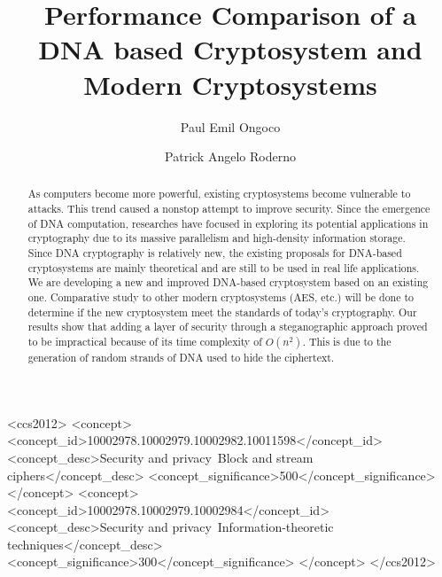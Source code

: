 \documentclass[acmlarge]{acmart}
\begin{document}
\title{Performance Comparison of a DNA based Cryptosystem and Modern Cryptosystems} 
\author{Paul Emil Ongoco}
\author{Patrick Angelo Roderno}


\begin{abstract}
As computers become more powerful, existing cryptosystems become vulnerable to attacks. This trend caused a nonstop attempt to improve security. Since the emergence of DNA computation, researches have focused in exploring its potential applications in cryptography due to its massive parallelism and high-density information storage. Since DNA cryptography is relatively new, the existing proposals for DNA-based cryptosystems are mainly theoretical and are still to be used in real life applications. We are developing a new and improved DNA-based cryptosystem based on an existing one. Comparative study to other modern cryptosystems (AES, etc.) will be done to determine if the new cryptosystem meet the standards of today's cryptography. Our results show that adding a layer of security through a steganographic approach proved to be impractical because of its time complexity of $O(n^2)$. This is due to the generation of random strands of DNA used to hide the ciphertext. 
\end{abstract}


%
%
\begin{CCSXML}
<ccs2012>
    <concept>
        <concept_id>10002978.10002979.10002982.10011598</concept_id>
        <concept_desc>Security and privacy~Block and stream ciphers</concept_desc>
        <concept_significance>500</concept_significance>
    </concept>
    <concept>
        <concept_id>10002978.10002979.10002984</concept_id>
        <concept_desc>Security and privacy~Information-theoretic techniques</concept_desc>
        <concept_significance>300</concept_significance>
    </concept>
</ccs2012>
\end{CCSXML}


%
%


\end{document}
